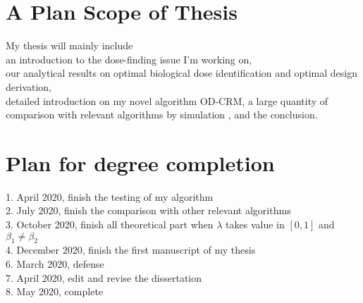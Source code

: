 \documentclass[12pt]{article}
\begin{document}
\section{A Plan Scope of Thesis}
My thesis will mainly include\\
an introduction to the dose-finding issue I'm working on,\\
our analytical results on optimal biological dose identification and optimal design derivation,\\
detailed introduction on my novel algorithm OD-CRM,
a large quantity of comparison with relevant algorithms by simulation ,
and the conclusion.\\

\nocite{*}


\newpage
\section{Plan for degree completion}
1. April 2020, finish the testing of my algorithm\\
2. July 2020, finish the comparison with other relevant algorithms\\
3. October 2020, finish all theoretical part when $\lambda$ takes value in $[0,1]$ and $\beta_1 \neq \beta_2$\\
4. December 2020, finish the first manuscript of my thesis \\
6. March 2020, defense\\
7. April 2020, edit and revise the dissertation\\
8. May 2020, complete\\
\end{document}
